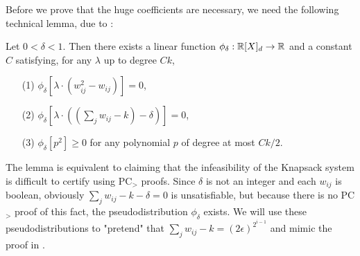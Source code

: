 Before we prove that the huge coefficients are necessary, we need the following technical lemma, due to \cite{Gri01b}:
\begin{lemma}\label{lem:knapsack-pd}
Let $0 < \delta < 1$. Then there exists a linear function $\phi_\delta: \mathbb R[X]_d \rightarrow \mathbb R$ and a constant $C$ satisfying, for any $\lambda$ up to degree $Ck$,
\begin{enumerate}
\item[(1)] $\phi_\delta[\lambda\cdot(w_{ij}^2 - w_{ij})] = 0$,
\item[(2)] $\phi_\delta[\lambda\cdot((\sum_j w_{ij} - k) - \delta)] = 0$,
\item[(3)] $\phi_\delta[p^2] \geq 0$ for any polynomial $p$ of degree at most $Ck/2$.
\end{enumerate}
\end{lemma}
The lemma is equivalent to claiming that the infeasibility of the Knapsack system is difficult to certify using PC$_>$ proofs. Since $\delta$ is not an integer and each $w_{ij}$ is boolean, obviously $\sum_j w_{ij} - k - \delta = 0$ is unsatisfiable, but because there is no PC$_>$ proof of this fact, the pseudodistribution $\phi_\delta$ exists. We will use these pseudodistributions to "pretend" that $\sum_j w_{ij} - k = (2\epsilon)^{2^{i-1}}$ and mimic the proof in .

